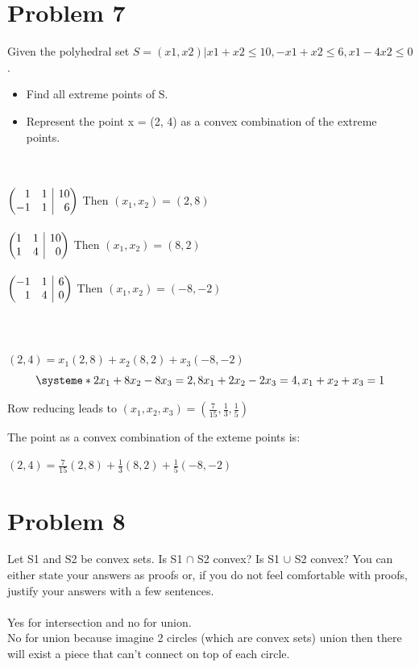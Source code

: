 \documentclass[11pt,a4paper,openany]{report}
\makeatletter
\newenvironment{sysmatrix}[1]
 {\left(\begin{array}{@{}#1@{}}}
 {\end{array}\right)}
\makeatother
\begin{document}
\section*{Problem 7}
Given the polyhedral set \(S = {(x1, x2)|x1 +x2 \leq 10, −x1 +x2 \leq 6, x1 −4x2 \leq 0}\).
\begin{itemize}
  \item Find all extreme points of S.
  \item Represent the point x = (2, 4) as a convex combination of the extreme points.
\end{itemize}\\\\
\(
\begin{sysmatrix}{rr|r}
  1 & 1 & 10 \\
  -1 & 1 & 6 \\
\end{sysmatrix}
\) Then \((x_1,x_2)=(2,8)\)
\\\\
\(
\begin{sysmatrix}{rr|r}
  1 & 1 & 10 \\
  1 & 4 & 0 \\
\end{sysmatrix}
\) Then \((x_1,x_2)=(8,2)\)
\\\\
\(
\begin{sysmatrix}{rr|r}
  -1 & 1 & 6 \\
  1 & 4 & 0 \\
\end{sysmatrix}
\) Then \((x_1,x_2)=(-8,-2)\)
\\\\\\\\
\((2,4)=x_1(2,8)+x_2(8,2)+x_3(-8,-2)\)
\[
\systeme*{
2x_1+8x_2-8x_3=2,
8x_1+2x_2-2x_3=4,
x_1+x_2+x_3=1
}
\]

Row reducing leads to \((x_1,x_2,x_3)=(\frac{7}{15},\frac{1}{3},\frac{1}{5})\)

The point as a convex combination of the exteme points is:

\((2,4)=\frac{7}{15}(2,8)+\frac{1}{3}(8,2)+\frac{1}{5}(-8,-2)\)

\newpage
\section*{Problem 8}
Let S1 and S2 be convex sets. Is S1 \(\cap\) S2 convex? Is S1 \(\cup\) S2 convex? You can either state your answers as proofs or, if you do not feel comfortable with proofs, justify your answers with a few sentences.\\\\

Yes for intersection and no for union.\\

No for union because imagine 2 circles (which are convex sets) union then there will exist a piece that can't connect on top of each circle.
\end{document}
